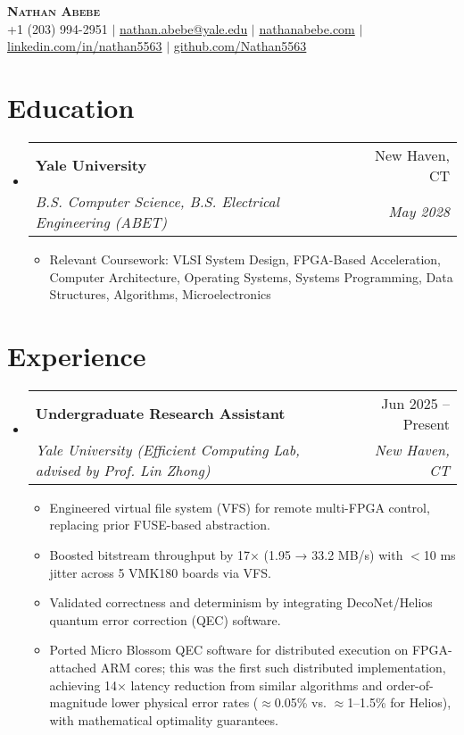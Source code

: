 \documentclass[letterpaper,11pt]{article}
\makeatletter
\newcommand{\resumeItem}[1]{
  \item\small{
    {#1 \vspace{-2pt}}
  }
}
\newcommand{\resumeSubheading}[4]{
  \vspace{-2pt}\item
    \begin{tabular*}{0.97\textwidth}[t]{l@{\extracolsep{\fill}}r}
      \textbf{#1} & #2 \\
      \textit{\small#3} & \textit{\small #4} \\
    \end{tabular*}\vspace{-7pt}
}
\newcommand{\resumeSubHeadingListStart}{\begin{itemize}[leftmargin=0.15in, label={}]}
\newcommand{\resumeSubHeadingListEnd}{\end{itemize}}
\newcommand{\resumeItemListStart}{\begin{itemize}}
\newcommand{\resumeItemListEnd}{\end{itemize}\vspace{-5pt}}
\makeatother
\begin{document}
\begin{center}
    \textbf{\Huge \scshape Nathan Abebe} \\ \vspace{5pt}
    \small +1 (203) 994-2951 $|$ \href{mailto:nathan.abebe@yale.edu}{nathan.abebe@yale.edu} $|$ \href{https://nathanabebe.com}{nathanabebe.com} $|$ 
    \href{https://linkedin.com/in/nathan5563}{linkedin.com/in/nathan5563} $|$
    \href{https://github.com/Nathan5563}{github.com/Nathan5563}
\end{center}


\section{Education}
  \resumeSubHeadingListStart
    \resumeSubheading
      {Yale University}{New Haven, CT}
      {B.S. Computer Science, B.S. Electrical Engineering (ABET)}{May 2028}
      \resumeItemListStart
        \resumeItem{Relevant Coursework: VLSI System Design, FPGA-Based Acceleration, Computer Architecture, Operating Systems, Systems Programming, Data Structures, Algorithms, Microelectronics }
      \resumeItemListEnd
  \resumeSubHeadingListEnd


\section{Experience}
  \resumeSubHeadingListStart
    \resumeSubheading
      {Undergraduate Research Assistant}{Jun 2025 -- Present}
      {Yale University (Efficient Computing Lab, advised by Prof. Lin Zhong)}{New Haven, CT}
      \resumeItemListStart
        \resumeItem{Engineered virtual file system (VFS) for remote multi-FPGA control, replacing prior FUSE-based abstraction.}
        \resumeItem{Boosted bitstream throughput by 17× (1.95 → 33.2 MB/s) with $<$10 ms jitter across 5 VMK180 boards via VFS.}
        \resumeItem{Validated correctness and determinism by integrating DecoNet/Helios quantum error correction (QEC) software.}
        \resumeItem{Ported Micro Blossom QEC software for distributed execution on FPGA-attached ARM cores; this was the first such distributed implementation, achieving 14× latency reduction from similar algorithms and order-of-magnitude lower physical error rates ($\approx$0.05\% vs. $\approx$1–1.5\% for Helios), with mathematical optimality guarantees.}
      \resumeItemListEnd
  \resumeSubHeadingListEnd


\end{document}

